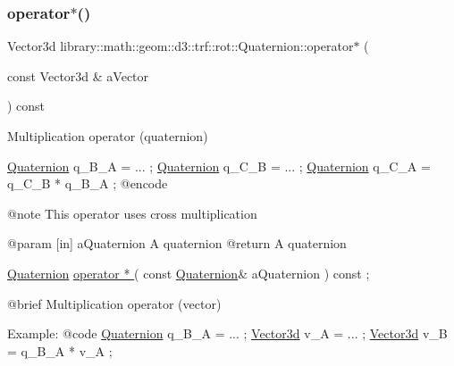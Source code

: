 \subsubsection{\texorpdfstring{operator$\ast$()}{operator*()}}
{\footnotesize\ttfamily Vector3d library\+::math\+::geom\+::d3\+::trf\+::rot\+::\+Quaternion\+::operator$\ast$ (\begin{DoxyParamCaption}\item[{const Vector3d \&}]{a\+Vector }\end{DoxyParamCaption}) const}



Multiplication operator (quaternion) 


\begin{DoxyCode}
                        \hyperlink{classlibrary_1_1math_1_1geom_1_1d3_1_1trf_1_1rot_1_1_quaternion_a1b8794cce68c5ee86dd50f9ba53635fa}{Quaternion} q\_B\_A = ... ;
                        \hyperlink{classlibrary_1_1math_1_1geom_1_1d3_1_1trf_1_1rot_1_1_quaternion_a1b8794cce68c5ee86dd50f9ba53635fa}{Quaternion} q\_C\_B = ... ;
                        \hyperlink{classlibrary_1_1math_1_1geom_1_1d3_1_1trf_1_1rot_1_1_quaternion_a1b8794cce68c5ee86dd50f9ba53635fa}{Quaternion} q\_C\_A = q\_C\_B * q\_B\_A ;
    @encode
   
    @note               This \textcolor{keyword}{operator} uses cross multiplication
   
    @param              [in] aQuaternion A quaternion
    @\textcolor{keywordflow}{return}             A quaternion

\hyperlink{classlibrary_1_1math_1_1geom_1_1d3_1_1trf_1_1rot_1_1_quaternion_a1b8794cce68c5ee86dd50f9ba53635fa}{Quaternion}              \hyperlink{classlibrary_1_1math_1_1geom_1_1d3_1_1trf_1_1rot_1_1_quaternion_a7f09ef0c53cb1f2d68a5c0aa8fb9de56}{operator *                                  }
      (   \textcolor{keyword}{const}   \hyperlink{classlibrary_1_1math_1_1geom_1_1d3_1_1trf_1_1rot_1_1_quaternion_a1b8794cce68c5ee86dd50f9ba53635fa}{Quaternion}&                 aQuaternion                                 ) \textcolor{keyword}{const} ;

    @brief              Multiplication operator (vector)
   
    Example:
    @code
                        \hyperlink{classlibrary_1_1math_1_1geom_1_1d3_1_1trf_1_1rot_1_1_quaternion_a1b8794cce68c5ee86dd50f9ba53635fa}{Quaternion} q\_B\_A = ... ;
                        \hyperlink{namespacelibrary_1_1math_1_1obj_a977e84e9bf317a4e7dd9d6d671d6da2f}{Vector3d} v\_A = ... ;
                        \hyperlink{namespacelibrary_1_1math_1_1obj_a977e84e9bf317a4e7dd9d6d671d6da2f}{Vector3d} v\_B = q\_B\_A * v\_A ;
\end{DoxyCode}


